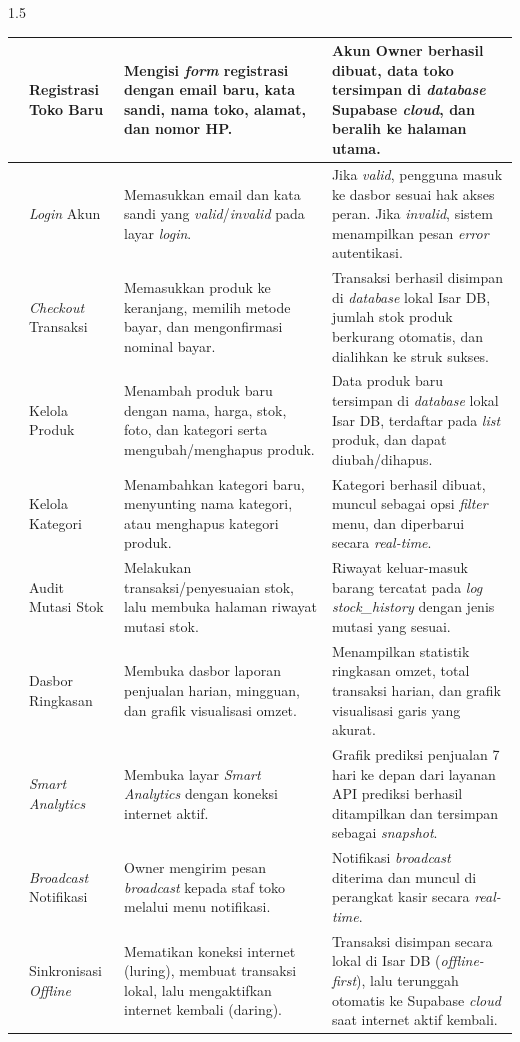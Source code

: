 \documentclass[12pt, a4paper, onecolumn, oneside]{report}
\begin{document}
\begin{spacing}{1.5}
{\begin{longtable}{|>{\centering\arraybackslash}p{0.6cm}|>{\raggedright\arraybackslash}p{3.0cm}|>{\raggedright\arraybackslash}p{4.7cm}|>{\raggedright\arraybackslash}p{4.7cm}|}
1 & Registrasi Toko Baru & Mengisi \textit{form} registrasi dengan email baru, kata sandi, nama toko, alamat, dan nomor HP. & Akun Owner berhasil dibuat, data toko tersimpan di \textit{database} Supabase \textit{cloud}, dan beralih ke halaman utama. \\
\hline
2 & \textit{Login} Akun & Memasukkan email dan kata sandi yang \textit{valid}/\textit{invalid} pada layar \textit{login}. & Jika \textit{valid}, pengguna masuk ke dasbor sesuai hak akses peran. Jika \textit{invalid}, sistem menampilkan pesan \textit{error} autentikasi. \\
\hline
3 & \textit{Checkout} Transaksi & Memasukkan produk ke keranjang, memilih metode bayar, dan mengonfirmasi nominal bayar. & Transaksi berhasil disimpan di \textit{database} lokal Isar DB, jumlah stok produk berkurang otomatis, dan dialihkan ke struk sukses. \\
\hline
4 & Kelola Produk & Menambah produk baru dengan nama, harga, stok, foto, dan kategori serta mengubah/menghapus produk. & Data produk baru tersimpan di \textit{database} lokal Isar DB, terdaftar pada \textit{list} produk, dan dapat diubah/dihapus. \\
\hline
5 & Kelola Kategori & Menambahkan kategori baru, menyunting nama kategori, atau menghapus kategori produk. & Kategori berhasil dibuat, muncul sebagai opsi \textit{filter} menu, dan diperbarui secara \textit{real-time}. \\
\hline
6 & Audit Mutasi Stok & Melakukan transaksi/penyesuaian stok, lalu membuka halaman riwayat mutasi stok. & Riwayat keluar-masuk barang tercatat pada \textit{log} \textit{stock\_history} dengan jenis mutasi yang sesuai. \\
\hline
7 & Dasbor Ringkasan & Membuka dasbor laporan penjualan harian, mingguan, dan grafik visualisasi omzet. & Menampilkan statistik ringkasan omzet, total transaksi harian, dan grafik visualisasi garis yang akurat. \\
\hline
8 & \textit{Smart Analytics} & Membuka layar \textit{Smart Analytics} dengan koneksi internet aktif. & Grafik prediksi penjualan 7 hari ke depan dari layanan API prediksi berhasil ditampilkan dan tersimpan sebagai \textit{snapshot}. \\
\hline
9 & \textit{Broadcast} Notifikasi & Owner mengirim pesan \textit{broadcast} kepada staf toko melalui menu notifikasi. & Notifikasi \textit{broadcast} diterima dan muncul di perangkat kasir secara \textit{real-time}. \\
\hline
10 & Sinkronisasi \textit{Offline} & Mematikan koneksi internet (luring), membuat transaksi lokal, lalu mengaktifkan internet kembali (daring). & Transaksi disimpan secara lokal di Isar DB (\textit{offline-first}), lalu terunggah otomatis ke Supabase \textit{cloud} saat internet aktif kembali. \\

\end{longtable}}
\end{spacing}
\end{document}
